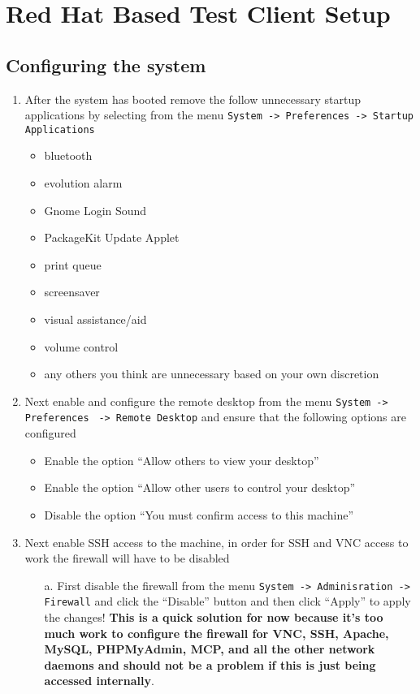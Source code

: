 \section{Red Hat Based Test Client Setup}
\subsection{Configuring the system}
\label{sec:rhconfig}
\begin{enumerate}
\item 	After the system has booted remove the follow unnecessary startup applications by selecting from the menu  
		\verb|System -> Preferences -> Startup Applications|
\begin{itemize}
\item	bluetooth
\item	evolution alarm
\item	Gnome Login Sound
\item	PackageKit Update Applet
\item	print queue
\item	screensaver
\item	visual assistance/aid
\item	volume control
\item	any others you think are unnecessary based on your own discretion
\end{itemize}

\item	Next enable and configure the remote desktop from the menu \verb|System -> Preferences| \verb| -> Remote Desktop| 
		and ensure that the following options are configured	
\begin{itemize}
\item	Enable the option ``Allow others to view your desktop''
\item	Enable the option ``Allow other users to control your desktop''
\item	Disable the option ``You must confirm access to this machine''
\end{itemize}
			
\item	Next enable SSH access to the machine, in order for SSH and VNC access to work the firewall will have to be disabled
\begin{itemize}
\item[a.]	First disable the firewall from the menu \verb|System -> Adminisration -> Firewall| and click the ``Disable'' 
			button and then click ``Apply'' to apply the changes! {\bf This is a quick solution for now because it's too 
			much work to configure the firewall for VNC, SSH, Apache, MySQL, PHPMyAdmin, MCP, and all the other network 
			daemons and should not be a problem if this is just being accessed internally}.


\end{itemize}
\end{enumerate}
